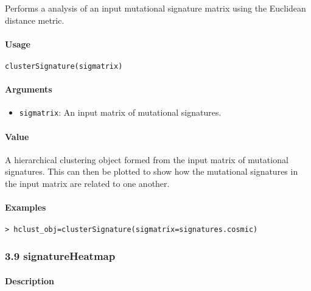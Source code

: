 \documentclass[]{article}
\providecommand{\tightlist}{%
  \setlength{\itemsep}{0pt}\setlength{\parskip}{0pt}}
\let\oldparagraph\paragraph
\renewcommand{\paragraph}[1]{\oldparagraph{#1}\mbox{}}
\begin{document}
Performs a  analysis of an input mutational
signature matrix using the Euclidean distance metric.

\paragraph{\texorpdfstring{\textbf{Usage}}{Usage}}\label{usage-7}

\texttt{clusterSignature(sigmatrix)}

\paragraph{\texorpdfstring{\textbf{Arguments
}}{Arguments }}\label{arguments-6}

\begin{itemize}
\tightlist
\item
  \texttt{sigmatrix}: An input matrix of mutational signatures.
\end{itemize}

\paragraph{\texorpdfstring{\textbf{Value}}{Value}}\label{value-5}

A hierarchical clustering object formed from the input matrix of
mutational signatures. This can then be plotted to show how the
mutational signatures in the input matrix are related to one another.

\paragraph{\texorpdfstring{\textbf{Examples}}{Examples}}\label{examples-7}

\begin{verbatim}
> hclust_obj=clusterSignature(sigmatrix=signatures.cosmic) 
\end{verbatim}

\subsubsection{3.9 signatureHeatmap}\label{signatureheatmap}

\paragraph{\texorpdfstring{\textbf{Description}}{Description}}\label{description-7}
\end{document}
